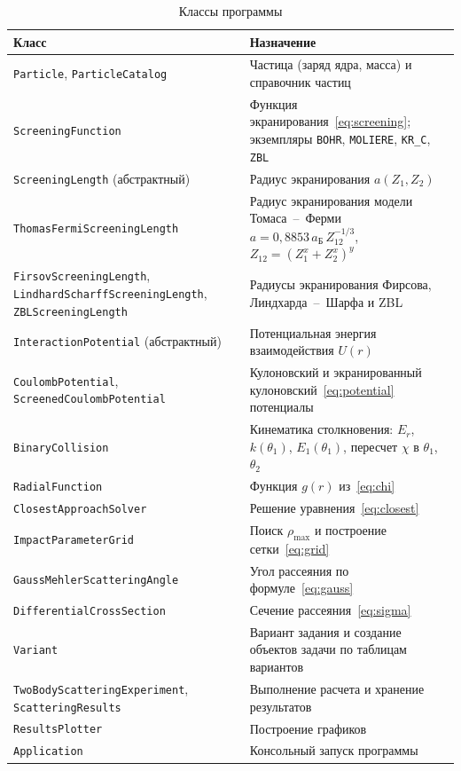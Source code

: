 \documentclass[a4paper,14pt]{extarticle}
\begin{document}
\begin{table}[H]
  \caption{Классы программы}
  \label{tab:classes}
  \small
  \begin{tabular}{|p{5.9cm}|p{9.3cm}|}
    \hline
    Класс & Назначение \\ \hline
    \texttt{Particle}, \texttt{ParticleCatalog} &
      Частица (заряд ядра, масса) и справочник частиц \\ \hline
    \texttt{ScreeningFunction} &
      Функция экранирования~\eqref{eq:screening}; экземпляры
      \texttt{BOHR}, \texttt{MOLIERE}, \texttt{KR\_C}, \texttt{ZBL} \\ \hline
    \texttt{ScreeningLength} (абстрактный) &
      Радиус экранирования $a(Z_1, Z_2)$ \\ \hline
    \texttt{ThomasFermiScreeningLength} &
      Радиус экранирования модели Томаса~--~Ферми
      $a = 0{,}8853\,a_\text{Б}\,Z_{12}^{-1/3}$,
      $Z_{12} = (Z_1^x + Z_2^x)^y$ \\ \hline
    \texttt{FirsovScreeningLength}, \texttt{LindhardScharff}\allowbreak\texttt{ScreeningLength},
    \texttt{ZBLScreeningLength} &
      Радиусы экранирования Фирсова, Линдхарда~--~Шарфа и ZBL \\ \hline
    \texttt{InteractionPotential} (абстрактный) &
      Потенциальная энергия взаимодействия $U(r)$ \\ \hline
    \texttt{CoulombPotential}, \texttt{ScreenedCoulombPotential} &
      Кулоновский и экранированный кулоновский~\eqref{eq:potential}
      потенциалы \\ \hline
    \texttt{BinaryCollision} &
      Кинематика столкновения: $E_r$, $k(\theta_1)$, $E_1(\theta_1)$,
      пересчет $\chi$ в $\theta_1$, $\theta_2$ \\ \hline
    \texttt{RadialFunction} & Функция $g(r)$ из~\eqref{eq:chi} \\ \hline
    \texttt{ClosestApproachSolver} &
      Решение уравнения~\eqref{eq:closest} \\ \hline
    \texttt{ImpactParameterGrid} &
      Поиск $\rho_{\max}$ и построение сетки~\eqref{eq:grid} \\ \hline
    \texttt{GaussMehlerScatteringAngle} &
      Угол рассеяния по формуле~\eqref{eq:gauss} \\ \hline
    \texttt{DifferentialCrossSection} &
      Сечение рассеяния~\eqref{eq:sigma} \\ \hline
    \texttt{Variant} &
      Вариант задания и создание объектов задачи по таблицам вариантов \\ \hline
    \texttt{TwoBodyScatteringExperiment}, \texttt{ScatteringResults} &
      Выполнение расчета и хранение результатов \\ \hline
    \texttt{ResultsPlotter} & Построение графиков \\ \hline
    \texttt{Application} & Консольный запуск программы \\ \hline
  \end{tabular}
\end{table}
\end{document}
